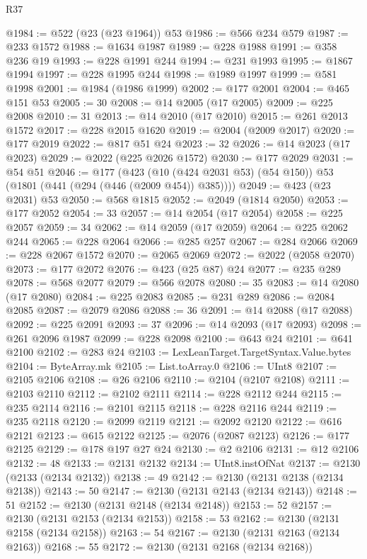 \begin{lexlean}{R37}
\begin{coremodule}
@1984 := @522 (@23 (@23 @1964)) @53
@1986 := @566 @234 @579
@1987 := @233 @1572
@1988 := @1634 @1987
@1989 := @228 @1988
@1991 := @358 @236 @19
@1993 := @228 @1991 @244
@1994 := @231 @1993
@1995 := @1867 @1994
@1997 := @228 @1995 @244
@1998 := @1989 @1997
@1999 := @581 @1998
@2001 := @1984 (@1986 @1999)
@2002 := @177 @2001
@2004 := @465 @151 @53
@2005 := 30
@2008 := @14 @2005 (@17 @2005)
@2009 := @225 @2008
@2010 := 31
@2013 := @14 @2010 (@17 @2010)
@2015 := @261 @2013 @1572
@2017 := @228 @2015 @1620
@2019 := @2004 (@2009 @2017)
@2020 := @177 @2019
@2022 := @817 @51 @24
@2023 := 32
@2026 := @14 @2023 (@17 @2023)
@2029 := @2022 (@225 @2026 @1572)
@2030 := @177 @2029
@2031 := @54 @51
@2046 := @177
    (@423 (@10 (@424 @2031 @53) (@54 @150)) @53 (@1801 (@441 (@294 (@446 (@2009 @454)) @385))))
@2049 := @423 (@23 @2031) @53
@2050 := @568 @1815
@2052 := @2049 (@1814 @2050)
@2053 := @177 @2052
@2054 := 33
@2057 := @14 @2054 (@17 @2054)
@2058 := @225 @2057
@2059 := 34
@2062 := @14 @2059 (@17 @2059)
@2064 := @225 @2062 @244
@2065 := @228 @2064
@2066 := @285 @257
@2067 := @284 @2066
@2069 := @228 @2067 @1572
@2070 := @2065 @2069
@2072 := @2022 (@2058 @2070)
@2073 := @177 @2072
@2076 := @423 (@25 @87) @24
@2077 := @235 @289
@2078 := @568 @2077
@2079 := @566 @2078
@2080 := 35
@2083 := @14 @2080 (@17 @2080)
@2084 := @225 @2083
@2085 := @231 @289
@2086 := @2084 @2085
@2087 := @2079 @2086
@2088 := 36
@2091 := @14 @2088 (@17 @2088)
@2092 := @225 @2091
@2093 := 37
@2096 := @14 @2093 (@17 @2093)
@2098 := @261 @2096 @1987
@2099 := @228 @2098
@2100 := @643 @24
@2101 := @641 @2100
@2102 := @283 @24
@2103 := LexLeanTarget.TargetSyntax.Value.bytes
@2104 := ByteArray.mk
@2105 := List.toArray.{0}
@2106 := UInt8
@2107 := @2105 @2106
@2108 := @26 @2106
@2110 := @2104 (@2107 @2108)
@2111 := @2103 @2110
@2112 := @2102 @2111
@2114 := @228 @2112 @244
@2115 := @235 @2114
@2116 := @2101 @2115
@2118 := @228 @2116 @244
@2119 := @235 @2118
@2120 := @2099 @2119
@2121 := @2092 @2120
@2122 := @616 @2121
@2123 := @615 @2122
@2125 := @2076 (@2087 @2123)
@2126 := @177 @2125
@2129 := @178 @197 @27 @24
@2130 := @2 @2106
@2131 := @12 @2106
@2132 := 48
@2133 := @2131 @2132
@2134 := UInt8.instOfNat
@2137 := @2130 (@2133 (@2134 @2132))
@2138 := 49
@2142 := @2130 (@2131 @2138 (@2134 @2138))
@2143 := 50
@2147 := @2130 (@2131 @2143 (@2134 @2143))
@2148 := 51
@2152 := @2130 (@2131 @2148 (@2134 @2148))
@2153 := 52
@2157 := @2130 (@2131 @2153 (@2134 @2153))
@2158 := 53
@2162 := @2130 (@2131 @2158 (@2134 @2158))
@2163 := 54
@2167 := @2130 (@2131 @2163 (@2134 @2163))
@2168 := 55
@2172 := @2130 (@2131 @2168 (@2134 @2168))

\end{coremodule}
\end{lexlean}
